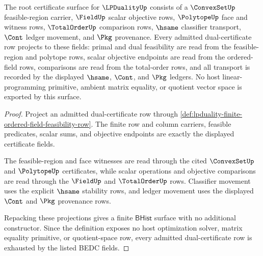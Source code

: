 \begin{theorem}
\label{thm:lpduality-root-obligation-surface}
The root certificate surface for $\LPDualityUp$ consists of a
$\ConvexSetUp$ feasible-region carrier, $\FieldUp$ scalar objective rows,
$\PolytopeUp$ face and witness rows, $\TotalOrderUp$ comparison rows, $\hsame$
classifier transport, $\Cont$ ledger movement, and $\Pkg$ provenance. Every
admitted dual-certificate row projects to these fields: primal and dual
feasibility are read from the feasible-region and polytope rows, scalar
objective endpoints are read from the ordered-field rows, comparisons are read
from the total-order rows, and all transport is recorded by the displayed
$\hsame$, $\Cont$, and $\Pkg$ ledgers. No host linear-programming primitive,
ambient matrix equality, or quotient vector space is exported by this surface.
\end{theorem}
\begin{proof}
Project an admitted dual-certificate row through
\autoref{def:lpduality-finite-ordered-field-feasibility-row}. The finite row
and column carriers, feasible predicates, scalar sums, and objective endpoints
are exactly the displayed certificate fields.

The feasible-region and face witnesses are read through the cited
$\ConvexSetUp$ and $\PolytopeUp$ certificates, while scalar operations and
objective comparisons are read through the $\FieldUp$ and $\TotalOrderUp$
rows. Classifier movement uses the explicit $\hsame$ stability rows, and
ledger movement uses the displayed $\Cont$ and $\Pkg$ provenance rows.

Repacking these projections gives a finite $\mathsf{BHist}$ surface with no
additional constructor. Since the definition exposes no host optimization
solver, matrix equality primitive, or quotient-space row, every admitted
dual-certificate row is exhausted by the listed BEDC fields.
\end{proof}

